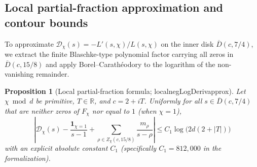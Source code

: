 \documentclass[11pt,reqno]{amsart}
\numberwithin{equation}{section}
\newtheorem{proposition}[theorem]{Proposition}
\theoremstyle{definition}
\newcommand{\R}{\mathbb{R}}
\newcommand{\1}{\mathbf{1}}
\newcommand{\D}{\mathcal{D}}
\newcommand{\lean}[1]{{\footnotesize\ttfamily\renewcommand{\_}{\textunderscore\allowbreak}#1}}
\begin{document}
\subsection{Local partial-fraction approximation and contour bounds}

To approximate $\D_\chi(s) = -L'(s, \chi)/L(s, \chi)$ on the inner disk $\overline{D}(c, 7/4)$, we extract the finite Blaschke-type polynomial factor carrying all zeros in $\overline{D}(c, 15/8)$ and apply Borel--Carath\'eodory to the logarithm of the non-vanishing remainder.

\begin{proposition}[Local partial-fraction formula; \lean{local\_negLogDeriv\_approx}]
\label{prop:local-approx}
Let $\chi \bmod d$ be primitive, $T \in \R$, and $c = 2 + iT$. Uniformly for all $s \in \overline{D}(c, 7/4)$ that are neither zeros of $F_\chi$ nor equal to $1$ (when $\chi = 1$),
\begin{equation}\label{eq:local-approx}
  \left|\D_\chi(s) - \frac{\1_{\chi=1}}{s-1} + \sum_{\rho \in Z_\chi(c, 15/8)} \frac{m_\rho}{s - \rho}\right|
  \le C_1 \log\bigl(2 d (2 + |T|)\bigr)
\end{equation}
with an explicit absolute constant $C_1$ (specifically $C_1 = 812{,}000$ in the formalization).
\end{proposition}
\end{document}
